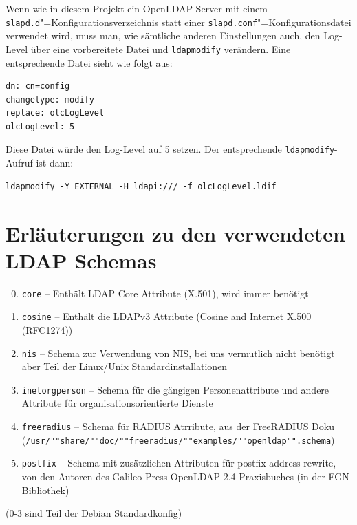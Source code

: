 \documentclass[11pt,a4paper,titlepage=firstiscover,headsepline,bibtotoc]{scrartcl} %
\begin{document}
Wenn wie in diesem Projekt ein OpenLDAP-Server mit einem \texttt{slapd.d}"=Konfigurationsverzeichnis statt einer \texttt{slapd.conf}"=Konfigurationsdatei verwendet wird, muss man, wie sämtliche anderen Einstellungen auch, den Log-Level über eine vorbereitete Datei und \texttt{ldapmodify} verändern. Eine entsprechende Datei sieht wie folgt aus:
\begin{lstlisting}
dn: cn=config
changetype: modify
replace: olcLogLevel
olcLogLevel: 5
\end{lstlisting}
Diese Datei würde den Log-Level auf 5 setzen. Der entsprechende \texttt{ldapmodify}-Aufruf ist dann:
\begin{lstlisting}
ldapmodify -Y EXTERNAL -H ldapi:/// -f olcLogLevel.ldif
\end{lstlisting}


\newpage
\section{Erläuterungen zu den verwendeten LDAP Schemas}\label{sec:LDAP-Schema}
\begin{enumerate}
\setcounter{enumi}{-1}
\item \texttt{core} -- Enthält LDAP Core Attribute (X.501), wird immer benötigt
\item \texttt{cosine} -- Enthält die LDAPv3 Attribute (Cosine and Internet X.500 (RFC1274))
\item \texttt{nis} -- Schema zur Verwendung von NIS, bei uns vermutlich nicht benötigt aber Teil der Linux/Unix Standardinstallationen
\item \texttt{inetorgperson} -- Schema für die gängigen Personenattribute und andere Attribute für organisationsorientierte Dienste
\item \texttt{freeradius} -- Schema für RADIUS Atrribute, aus der FreeRADIUS Doku (\texttt{/usr/""share/""doc/""freeradius/""examples/""openldap"".schema})
\item \texttt{postfix} -- Schema mit zusätzlichen Attributen für postfix address rewrite, von den Autoren des Galileo Press OpenLDAP 2.4 Praxisbuches (in der FGN Bibliothek)
\end{enumerate}
(0-3 sind Teil der Debian Standardkonfig)

\newpage
\end{document}

